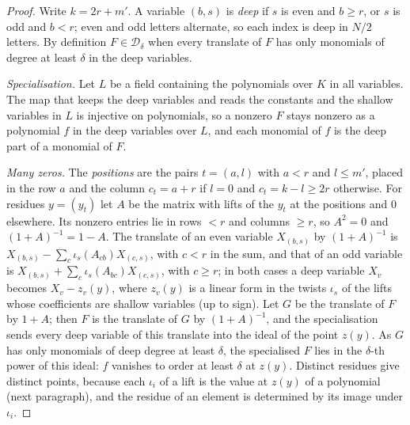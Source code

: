 \begin{proof}
Write $k=2r+m'$. A variable $(b,s)$ is \emph{deep} if $s$ is even and $b\ge r$, or $s$ is odd and $b<r$; even and odd letters alternate, so each index is deep in $N/2$ letters. By definition $F\in\mathcal D_\delta$ when every translate of $F$
has only monomials of degree at least $\delta$ in the deep variables.

\emph{Specialisation.} Let $L$ be a field containing the polynomials over $K$ in all variables. The map that keeps the deep variables and reads the constants and the shallow variables in $L$ is injective on polynomials, so a nonzero $F$ stays
nonzero as a polynomial $f$ in the deep variables over $L$, and each monomial of $f$ is the deep part of a monomial of $F$.

\emph{Many zeros.} The \emph{positions} are the pairs $t=(a,l)$ with $a<r$ and $l\le m'$, placed in the row $a$ and the column $c_t=a+r$ if $l=0$ and $c_t=k-l\ge2r$ otherwise. For residues $y=(y_t)$ let $A$ be the matrix with lifts of the $y_t$ at the positions
and $0$ elsewhere. Its nonzero entries lie in rows $<r$ and columns $\ge r$, so $A^2=0$ and $(1+A)^{-1}=1-A$. The translate of an even variable $X_{(b,s)}$ by $(1+A)^{-1}$ is $X_{(b,s)}-\sum_c\iota_s(A_{cb})X_{(c,s)}$, with $c<r$ in the sum, and that of an
odd variable is $X_{(b,s)}+\sum_c\iota_s(A_{bc})X_{(c,s)}$, with $c\ge r$; in both cases a deep variable $X_v$ becomes $X_v-z_v(y)$, where $z_v(y)$ is a linear form in the twists $\iota_s$ of the lifts whose coefficients are shallow variables (up to sign).
Let $G$ be the translate of $F$ by $1+A$; then $F$ is the translate of $G$ by $(1+A)^{-1}$, and the specialisation sends every deep variable of this translate into the ideal of the point $z(y)$. As $G$ has only monomials of deep degree at least $\delta$, the
specialised $F$ lies in the $\delta$-th power of this ideal: $f$ vanishes to order at least $\delta$ at $z(y)$. Distinct residues give distinct points, because each $\iota_i$ of a lift is the value at $z(y)$ of a polynomial (next paragraph), and the residue of an
element is determined by its image under $\iota_i$.


\end{proof}
